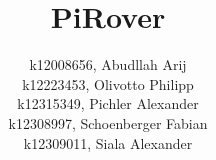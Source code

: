 \documentclass[12pt]{article}
\begin{document}
    \title{PiRover}

    \date{}
    \author{
        k12008656, Abudllah Arij\\
        k12223453, Olivotto Philipp\\
        k12315349, Pichler Alexander\\
        k12308997, Schoenberger Fabian\\
        k12309011, Siala Alexander
    }

    \maketitle
    \tableofcontents

    \newpage

    
    
    
    
    
    
    
\end{document}
